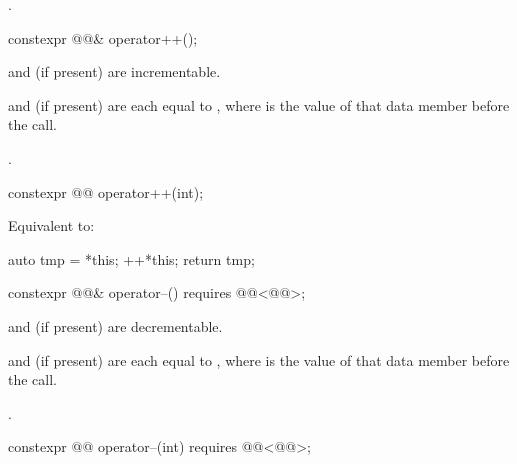 \begin{itemdescr}
\pnum
\returns
{}.
\end{itemdescr}

%
\begin{itemdecl}
constexpr @@& operator++();
\end{itemdecl}

\begin{itemdescr}
\pnum
\expects
{} and  (if present) are incrementable.

\pnum
\ensures
{} and  (if present) are
each equal to ,
where  is the value of that data member before the call.

\pnum
\returns
{}.
\end{itemdescr}

%
\begin{itemdecl}
constexpr @@ operator++(int);
\end{itemdecl}

\begin{itemdescr}
\pnum
\effects
Equivalent to:
\begin{codeblock}
auto tmp = *this;
++*this;
return tmp;
\end{codeblock}
\end{itemdescr}

%
\begin{itemdecl}
constexpr @@& operator--() requires @@<@@>;
\end{itemdecl}

\begin{itemdescr}
\pnum
\expects
{} and  (if present) are decrementable.

\pnum
\ensures
{} and  (if present) are
each equal to ,
where  is the value of that data member before the call.

\pnum
\returns
{}.
\end{itemdescr}

%
\begin{itemdecl}
constexpr @@ operator--(int) requires @@<@@>;
\end{itemdecl}

